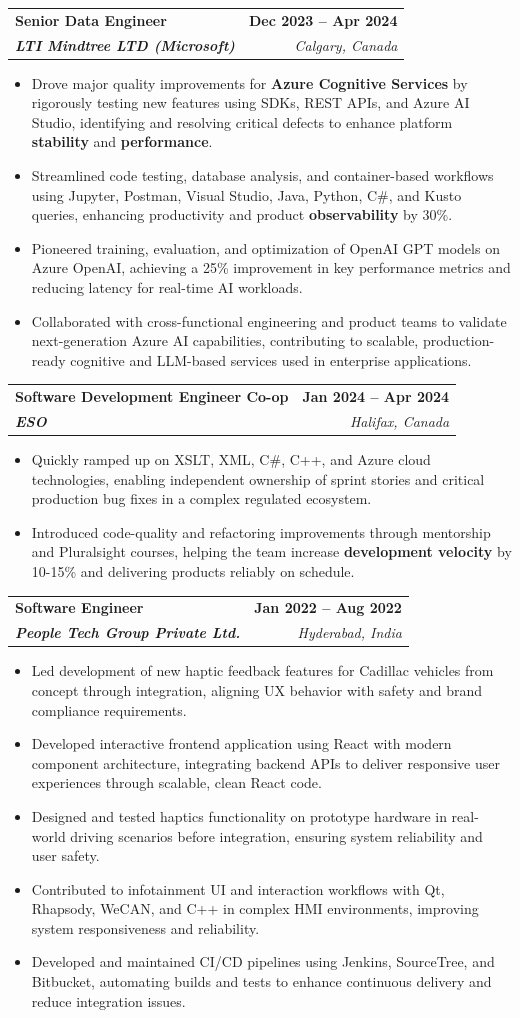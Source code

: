 \documentclass[letterpaper,11pt]{article}
\makeatletter
\newcommand{\resumeItem}[1]{
  \item\small{
    {#1 \vspace{-2pt}}
  }
}
\newcommand{\resumeSubheading}[4]{
  \vspace{-2pt}\item
    \begin{tabular*}{1.0\textwidth}[t]{l@{\extracolsep{\fill}}r}
      \textbf{#1} & \textbf{\small #2} \\
      \textit{\small#3} & \textit{\small #4} \\
    \end{tabular*}\vspace{-7pt}
}
\newcommand{\resumeItemListStart}{\begin{itemize}}
\newcommand{\resumeItemListEnd}{\end{itemize}\vspace{-5pt}}
\makeatother
\begin{document}
    \resumeSubheading
      {\textbf{Senior Data Engineer}}{\textbf{Dec 2023 -- Apr 2024}}
      {\textbf{LTI Mindtree LTD (Microsoft)}}{Calgary, Canada}
      \resumeItemListStart
        \resumeItem{Drove major quality improvements for \textbf{Azure Cognitive Services} by rigorously testing new features using SDKs, REST APIs, and Azure AI Studio, identifying and resolving critical defects to enhance platform \textbf{stability} and \textbf{performance}.}
        \resumeItem{Streamlined code testing, database analysis, and container-based workflows using Jupyter, Postman, Visual Studio, Java, Python, C\#, and Kusto queries, enhancing productivity and product \textbf{observability} by 30\%.}
        \resumeItem{Pioneered training, evaluation, and optimization of OpenAI GPT models on Azure OpenAI, achieving a 25\% improvement in key performance metrics and reducing latency for real-time AI workloads.}
        \resumeItem{Collaborated with cross-functional engineering and product teams to validate next-generation Azure AI capabilities, contributing to scalable, production-ready cognitive and LLM-based services used in enterprise applications.}
      \resumeItemListEnd
    
    \resumeSubheading
      {\textbf{Software Development Engineer Co-op}}{\textbf{Jan 2024 -- Apr 2024}}
      {\textbf{ESO}}{Halifax, Canada}
      \resumeItemListStart
        \resumeItem{Quickly ramped up on XSLT, XML, C\#, C++, and Azure cloud technologies, enabling independent ownership of sprint stories and critical production bug fixes in a complex regulated ecosystem.}
        \resumeItem{Introduced code-quality and refactoring improvements through mentorship and Pluralsight courses, helping the team increase \textbf{development velocity} by 10-15\% and delivering products reliably on schedule.}
      \resumeItemListEnd

    \resumeSubheading
      {\textbf{Software Engineer}}{\textbf{Jan 2022 -- Aug 2022}}
      {\textbf{People Tech Group Private Ltd.}}{Hyderabad, India}
      \resumeItemListStart
        \resumeItem{Led development of new haptic feedback features for Cadillac vehicles from concept through integration, aligning UX behavior with safety and brand compliance requirements.}
        \resumeItem{Developed interactive frontend application using React with modern component architecture, integrating backend APIs to deliver responsive user experiences through scalable, clean React code.}
        \resumeItem{Designed and tested haptics functionality on prototype hardware in real-world driving scenarios before integration, ensuring system reliability and user safety.}
        \resumeItem{Contributed to infotainment UI and interaction workflows with Qt, Rhapsody, WeCAN, and C++ in complex HMI environments, improving system responsiveness and reliability.}
        \resumeItem{Developed and maintained CI/CD pipelines using Jenkins, SourceTree, and Bitbucket, automating builds and tests to enhance continuous delivery and reduce integration issues.}
      \resumeItemListEnd
\end{document}
